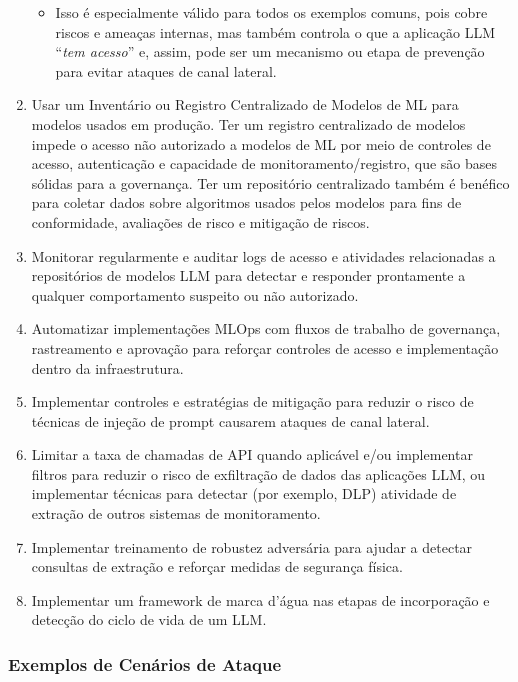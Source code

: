 \documentclass[
]{article}
\providecommand{\tightlist}{%
  \setlength{\itemsep}{0pt}\setlength{\parskip}{0pt}}
\begin{document}
\begin{enumerate}
  \begin{itemize}
  \tightlist
  \item
    Isso é especialmente válido para todos os exemplos comuns, pois
    cobre riscos e ameaças internas, mas também controla o que a
    aplicação LLM ``\emph{tem acesso}'' e, assim, pode ser um mecanismo
    ou etapa de prevenção para evitar ataques de canal lateral.
  \end{itemize}
\item
  Usar um Inventário ou Registro Centralizado de Modelos de ML para
  modelos usados em produção. Ter um registro centralizado de modelos
  impede o acesso não autorizado a modelos de ML por meio de controles
  de acesso, autenticação e capacidade de monitoramento/registro, que
  são bases sólidas para a governança. Ter um repositório centralizado
  também é benéfico para coletar dados sobre algoritmos usados pelos
  modelos para fins de conformidade, avaliações de risco e mitigação de
  riscos.
\item
  Monitorar regularmente e auditar logs de acesso e atividades
  relacionadas a repositórios de modelos LLM para detectar e responder
  prontamente a qualquer comportamento suspeito ou não autorizado.
\item
  Automatizar implementações MLOps com fluxos de trabalho de governança,
  rastreamento e aprovação para reforçar controles de acesso e
  implementação dentro da infraestrutura.
\item
  Implementar controles e estratégias de mitigação para reduzir o risco
  de técnicas de injeção de prompt causarem ataques de canal lateral.
\item
  Limitar a taxa de chamadas de API quando aplicável e/ou implementar
  filtros para reduzir o risco de exfiltração de dados das aplicações
  LLM, ou implementar técnicas para detectar (por exemplo, DLP)
  atividade de extração de outros sistemas de monitoramento.
\item
  Implementar treinamento de robustez adversária para ajudar a detectar
  consultas de extração e reforçar medidas de segurança física.
\item
  Implementar um framework de marca d'água nas etapas de incorporação e
  detecção do ciclo de vida de um LLM.
\end{enumerate}

\subsubsection{Exemplos de Cenários de
Ataque}\label{exemplos-de-cenuxe1rios-de-ataque}
\end{document}
